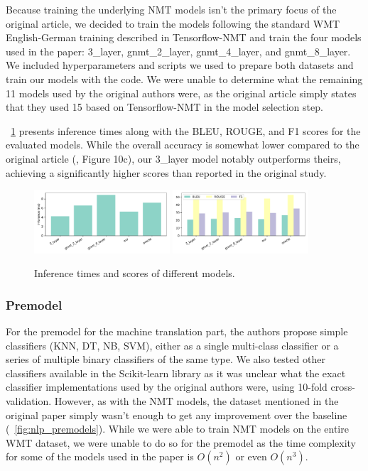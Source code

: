 Because training the underlying NMT models isn't the primary focus of the original article, we decided to train the models following the standard WMT English-German training described in Tensorflow-NMT and train the four models used in the paper: 3\_layer, gnmt\_2\_layer, gnmt\_4\_layer, and gnmt\_8\_layer. We included hyperparameters and scripts we used to prepare both datasets and train our models with the code. We were unable to determine what the remaining 11 models used by the original authors were, as the original article simply states that they used 15  based on Tensorflow-NMT in the model selection step.

\figurename~\ref{fig:nlp_scores} presents inference times along with the BLEU, ROUGE, and F1 scores for the evaluated models. While the overall accuracy is somewhat lower compared to the original article (\cite{marco2019optimizing}, Figure 10c), our 3\_layer model notably outperforms theirs, achieving a significantly higher scores than reported in the original study.

\begin{figure}[ht]
	\centering
	\includegraphics[width=0.45\textwidth]{figures/ml_inf_time.pdf}\quad
	\includegraphics[width=0.45\textwidth]{figures/ml_inf_score.pdf}
	\caption{Inference times and scores of different models.}
	\label{fig:nlp_scores}
\end{figure}

\subsubsection{Premodel}
For the premodel for the machine translation part, the authors propose simple classifiers (KNN, DT, NB, SVM), either as a single multi-class classifier or a series of multiple binary classifiers of the same type. We also tested other classifiers available in the Scikit-learn library as it was unclear what the exact classifier implementations used by the original authors were, using 10-fold cross-validation. However, as with the NMT models, the dataset mentioned in the original paper simply wasn't enough to get any improvement over the baseline (\figurename~\ref{fig:nlp_premodels}). While we were able to train NMT models on the entire WMT dataset, we were unable to do so for the premodel as the time complexity for some of the models used in the paper is \(O(n^2)\) or even \(O(n^3)\).

